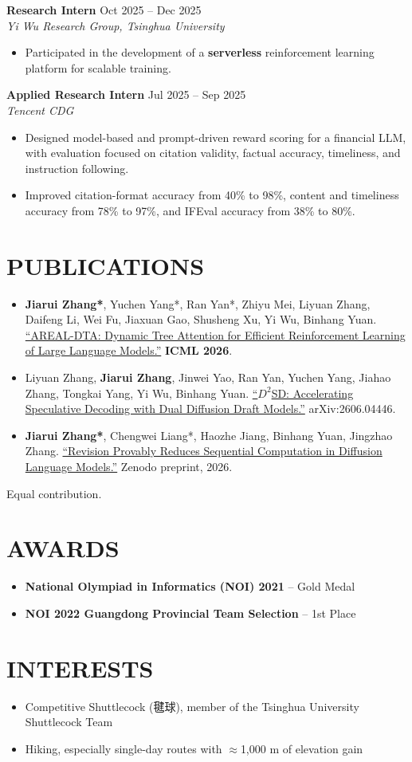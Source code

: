 \documentclass[11pt,a4paper]{article}
\newcommand{\entry}[4]{%
  \textbf{#1} \hfill {\small #2}\\[-1pt]
  \textit{#3} \hfill {\small\textit{#4}}%
}
\begin{document}
\entry{Research Intern}{Oct 2025 -- Dec 2025}{Yi Wu Research Group, Tsinghua University}{}
\begin{itemize}
  \item Participated in the development of a \textbf{serverless} reinforcement learning platform for scalable training.
\end{itemize}

\entry{Applied Research Intern}{Jul 2025 -- Sep 2025}{Tencent CDG}{}
\begin{itemize}
  \item Designed model-based and prompt-driven reward scoring for a financial LLM, with evaluation focused on citation validity, factual accuracy, timeliness, and instruction following.
  \item Improved citation-format accuracy from 40\% to 98\%, content and timeliness accuracy from 78\% to 97\%, and IFEval accuracy from 38\% to 80\%.
\end{itemize}

\section*{PUBLICATIONS}
\begin{itemize}
  \item \textbf{Jiarui Zhang*}, Yuchen Yang*, Ran Yan*, Zhiyu Mei, Liyuan Zhang, Daifeng Li, Wei Fu, Jiaxuan Gao, Shusheng Xu, Yi Wu, Binhang Yuan. \href{https://arxiv.org/abs/2602.00482}{``AREAL-DTA: Dynamic Tree Attention for Efficient Reinforcement Learning of Large Language Models.''} \textbf{ICML 2026}.
  \item Liyuan Zhang, \textbf{Jiarui Zhang}, Jinwei Yao, Ran Yan, Yuchen Yang, Jiahao Zhang, Tongkai Yang, Yi Wu, Binhang Yuan. \href{https://arxiv.org/abs/2606.04446}{``$D^2$SD: Accelerating Speculative Decoding with Dual Diffusion Draft Models.''} arXiv:2606.04446.
  \item \textbf{Jiarui Zhang*}, Chengwei Liang*, Haozhe Jiang, Binhang Yuan, Jingzhao Zhang. \href{https://zenodo.org/records/23105365}{``Revision Provably Reduces Sequential Computation in Diffusion Language Models.''} Zenodo preprint, 2026.
\end{itemize}
{\footnotesize * Equal contribution.}

\section*{AWARDS}
\begin{itemize}
  \item \textbf{National Olympiad in Informatics (NOI) 2021} -- Gold Medal
  \item \textbf{NOI 2022 Guangdong Provincial Team Selection} -- 1st Place
\end{itemize}

\section*{INTERESTS}
\begin{itemize}
  \item Competitive Shuttlecock (毽球), member of the Tsinghua University Shuttlecock Team
  \item Hiking, especially single-day routes with $\approx$1,000 m of elevation gain
\end{itemize}
\end{document}

